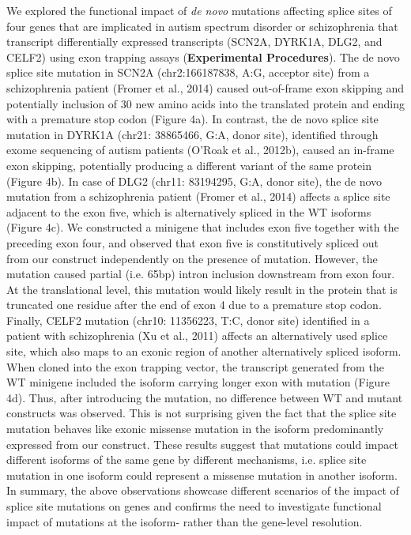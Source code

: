 We explored the functional impact of \textit{de novo} mutations affecting splice sites of four genes that are implicated in autism spectrum disorder or schizophrenia that transcript differentially expressed transcripts (SCN2A, DYRK1A, DLG2, and CELF2) using exon trapping assays (\textbf{Experimental Procedures}). The de novo splice site mutation in SCN2A (chr2:166187838, A:G, acceptor site) from a schizophrenia patient (Fromer et al., 2014) caused out-of-frame exon skipping and potentially inclusion of 30 new amino acids into the translated protein and ending with a premature stop codon (Figure 4a). In contrast, the de novo splice site mutation in DYRK1A (chr21: 38865466, G:A, donor site), identified through exome sequencing of autism patients (O'Roak et al., 2012b), caused an in-frame exon skipping, potentially producing a different variant of the same protein (Figure 4b). In case of DLG2 (chr11: 83194295, G:A, donor site), the de novo mutation from a schizophrenia patient (Fromer et al., 2014) affects a splice site adjacent to the exon five, which is alternatively spliced in the WT isoforms (Figure 4c). We constructed a minigene that includes exon five together with the preceding exon four, and observed that exon five is constitutively spliced out from our construct independently on the presence of mutation. However, the mutation caused partial (i.e. 65bp) intron inclusion downstream from exon four. At the translational level, this mutation would likely result in the protein that is truncated one residue after the end of exon 4 due to a premature stop codon. Finally, CELF2 mutation (chr10: 11356223, T:C, donor site) identified in a patient with schizophrenia (Xu et al., 2011) affects an alternatively used splice site, which also maps to an exonic region of another alternatively spliced isoform. When cloned into the exon trapping vector, the transcript generated from the WT minigene included the isoform carrying longer exon with mutation (Figure 4d). Thus, after introducing the mutation, no difference between WT and mutant constructs was observed. This is not surprising given the fact that the splice site mutation behaves like exonic missense mutation in the isoform predominantly expressed from our construct. These results suggest that mutations could impact different isoforms of the same gene by different mechanisms, i.e. splice site mutation in one isoform could represent a missense mutation in another isoform. In summary, the above observations showcase different scenarios of the impact of splice site mutations on genes and confirms the need to investigate functional impact of mutations at the isoform- rather than the gene-level resolution.\par

